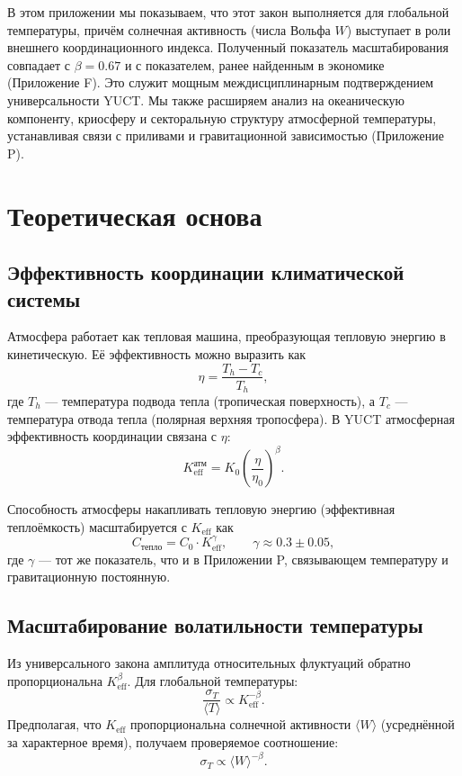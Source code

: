 \documentclass[12pt,a4paper]{article}
\newcommand{\Keff}{K_{\mathrm{eff}}}
\newcommand{\be}{\beta}
\newcommand{\ga}{\gamma}
\begin{document}
	В этом приложении мы показываем, что этот закон выполняется для глобальной температуры, причём солнечная активность (числа Вольфа \(W\)) выступает в роли внешнего координационного индекса. Полученный показатель масштабирования совпадает с \(\be = 0.67\) и с показателем, ранее найденным в экономике (Приложение F). Это служит мощным междисциплинарным подтверждением универсальности YUCT. Мы также расширяем анализ на океаническую компоненту, криосферу и секторальную структуру атмосферной температуры, устанавливая связи с приливами и гравитационной зависимостью (Приложение P).
	
	\section{Теоретическая основа}
	
	\subsection{Эффективность координации климатической системы}
	
	Атмосфера работает как тепловая машина, преобразующая тепловую энергию в кинетическую. Её эффективность можно выразить как
	\[
	\eta = \frac{T_h - T_c}{T_h},
	\]
	где \(T_h\) — температура подвода тепла (тропическая поверхность), а \(T_c\) — температура отвода тепла (полярная верхняя тропосфера). В YUCT атмосферная эффективность координации связана с \(\eta\):
	\[
	\Keff^{\text{атм}} = K_0 \left( \frac{\eta}{\eta_0} \right)^{\be}.
	\]
	
	Способность атмосферы накапливать тепловую энергию (эффективная теплоёмкость) масштабируется с \(\Keff\) как
	\[
	C_{\text{тепло}} = C_0 \cdot \Keff^{\ga}, \qquad \ga \approx 0.3 \pm 0.05,
	\]
	где \(\ga\) — тот же показатель, что и в Приложении P, связывающем температуру и гравитационную постоянную.
	
	\subsection{Масштабирование волатильности температуры}
	
	Из универсального закона амплитуда относительных флуктуаций обратно пропорциональна \(\Keff^{\be}\). Для глобальной температуры:
	\[
	\frac{\sigma_T}{\langle T \rangle} \propto \Keff^{-\be}.
	\]
	Предполагая, что \(\Keff\) пропорциональна солнечной активности \(\langle W \rangle\) (усреднённой за характерное время), получаем проверяемое соотношение:
	\[
	\sigma_T \propto \langle W \rangle^{-\be}.
	\]
	
\end{document}
